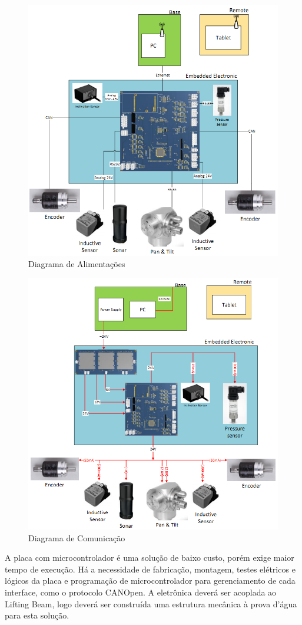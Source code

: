 \begin{figure}[H]
    \centering
    \includegraphics[width=0.5\columnwidth]{figs/eletronica/2.png}
    \caption{Diagrama de Alimentações}
    \label{alimentacao_placa}
\end{figure}

\begin{figure}[H]
    \centering
    \includegraphics[width=0.5\columnwidth]{figs/eletronica/3.png}
    \caption{Diagrama de Comunicação}
    \label{com_placa}
\end{figure}
 
A placa com microcontrolador é uma solução de baixo custo, porém exige maior tempo de execução. Há a necessidade de fabricação, montagem, testes elétricos e lógicos da placa e programação de microcontrolador para gerenciamento de cada interface, como o protocolo CANOpen. 
A eletrônica deverá ser acoplada ao Lifting Beam, logo deverá ser construída uma estrutura mecânica à prova d’água para esta solução.


